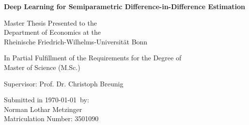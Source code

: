 

\begin{titlepage}

\begin{center}

\vspace*{0.4cm}

\huge {\bfseries Deep Learning for Semiparametric Difference-in-Difference Estimation}

\vspace{1cm}

\large {Master Thesis Presented to the}\\
\large {Department of Economics at the}\\
\large {Rheinische Friedrich-Wilhelms-Universität Bonn}\\

\end{center}

\vspace{1cm}

\begin{center}


\large {In Partial Fulfillment of the Requirements for the Degree of}\\
\large {Master of Science (M.Sc.)}\\

\end{center}
\vspace{1cm}
\begin{center}

\vspace*{1cm}


\large {Supervisor: Prof. Dr. Christoph Breunig}\\

\end{center}

\vspace{1cm}

\begin{center}

\vfill


\large {Submitted in \today \, by:}\\
\large {Norman Lothar Metzinger}\\
\large {Matriculation Number: 3501090}\\

\end{center}

\vspace{1cm}



\setcounter{page}{0}\clearpage




\end{titlepage}

\endinput
